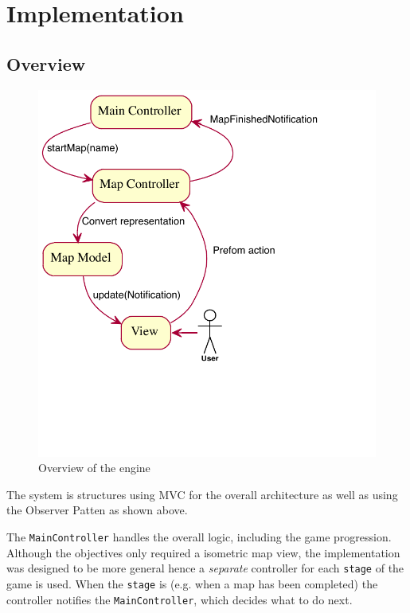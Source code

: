 
\section{Implementation}

\subsection{Overview}

\begin{figure}[htbp]
	\centering
		\includegraphics{figures/engine_exported.pdf}
	\caption{Overview of the engine}
	\label{fig:overview_engine}
\end{figure}

The system is structures using MVC for the overall architecture as well as  using the Observer Patten as shown above.

The \texttt{MainController} handles the overall logic, including the game progression. 
Although the objectives only required a isometric  map view, the implementation was designed to be more general  hence a \emph{separate} controller for each \texttt{stage} of the game is used. When the \texttt{stage} is  (e.g. when a map has been completed) the controller notifies the \texttt{MainController}, which decides what to do next.   

